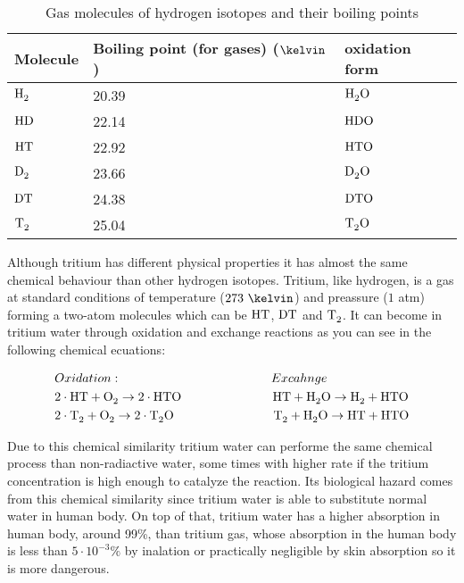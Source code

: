 \begin{table}[htbp]
\begin{center}
\begin{tabular}{|l|l|l|}
\hline
Molecule & Boiling point (for gases) ($\kelvin$) & oxidation form\\
\hline \hline \hline
$\ce{H_2}$ & 20.39 & $\ce{H_2 O}$ \\ \hline
$\ce{HD}$ & 22.14 & $\ce{HDO}$ \\ \hline
$\ce{HT}$ & 22.92 & $\ce{HTO}$ \\ \hline
$\ce{D_2}$ & 23.66 & $\ce{D_2 O}$ \\ \hline
$\ce{DT}$ & 24.38 & $\ce{DTO}$ \\ \hline
$\ce{T_2}$ & 25.04 & $\ce{T_2 O}$ \\ \hline
\end{tabular}
\caption{Gas molecules of hydrogen isotopes and their boiling points}
\label{tab:BoillingPoints}
\end{center}
\end{table}

Although tritium has different physical properties it has almost the same chemical behaviour than other hydrogen isotopes. Tritium, like hydrogen, is a gas at standard conditions of temperature ($273~\kelvin$) and preassure ($1$ atm) forming a two-atom molecules which can be $\ce{HT}$, $\ce{DT}$ and $\ce{T_2}$. It can become in tritium water through oxidation and exchange reactions as you can see in the following chemical ecuations\cite{TritiumHandling}:

\begin{equation}
\begin{split}
& Oxidation: \qquad \qquad \qquad \qquad \qquad \qquad Excahnge\\
& 2\cdot{}\ce{HT} + \ce{O_2} \rightarrow 2 \cdot{} \ce{HTO} ~ \quad \qquad \qquad \qquad \ce{HT} + \ce{H_2 O} \rightarrow \ce{H_2} + \ce{HTO}\\
& 2\cdot{}\ce{T_2} + \ce{O_2} \rightarrow 2 \cdot{} \ce{T_2 O} \qquad \qquad \qquad \qquad \ce{T_2} + \ce{H_2 O} \rightarrow \ce{HT} + \ce{HTO}
\label{eq:OxidationExchange}
\end{split}
\end{equation}

Due to this chemical similarity tritium water can performe the same chemical process than non-radiactive water, some times with higher rate if the tritium concentration is high enough to catalyze the reaction. Its biological hazard comes from this chemical similarity since tritium water is able to substitute normal water in human body. On top of that, tritium water has a higher absorption in human body, around 99\%, than tritium gas, whose absorption in the human body is less than $5 \cdot 10^{-3}\%$  by inalation or practically negligible by skin absorption \cite{TritiumHandling} so it is more dangerous.